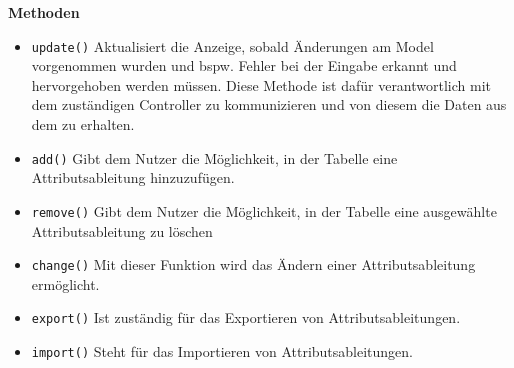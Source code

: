 \documentclass{article}
\newcommand{\classref}[1]{\texttt{\nameref{cls:#1}}}
\begin{document}
\textbf{Methoden}
\begin{itemize}
\item \texttt{update()} \newline Aktualisiert die Anzeige, sobald Änderungen am Model vorgenommen wurden und bspw. Fehler bei der Eingabe erkannt und hervorgehoben werden müssen. Diese Methode ist dafür verantwortlich mit dem zuständigen Controller zu kommunizieren und von diesem die Daten aus dem \classref{Model} zu erhalten.

\item \texttt{add()} \newline Gibt dem Nutzer die Möglichkeit, in der Tabelle eine Attributsableitung hinzuzufügen.

\item \texttt{remove()} \newline Gibt dem Nutzer die Möglichkeit, in der Tabelle eine ausgewählte Attributsableitung zu löschen

\item \texttt{change()} \newline Mit dieser Funktion wird das Ändern einer Attributsableitung ermöglicht.

\item \texttt{export()} \newline Ist zuständig für das Exportieren von Attributsableitungen.

\item \texttt{import()} \newline Steht für das Importieren von Attributsableitungen.
\end{itemize}
\end{document}
